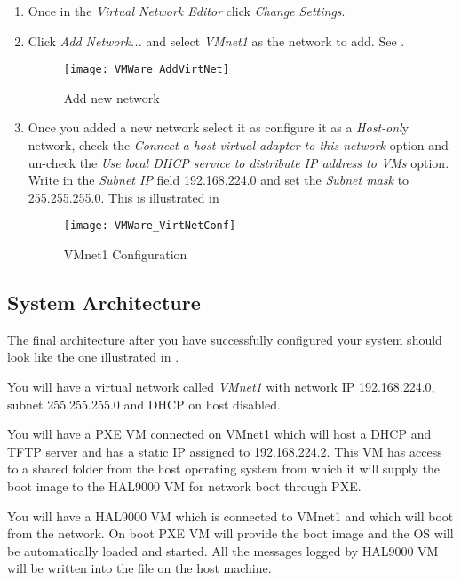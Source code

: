 \begin{appendices}
\begin{enumerate}
	\item Once in the \textit{Virtual Network Editor} click \textit{Change Settings}.

	\item Click \textit{Add Network...} and select \textit{VMnet1} as the network to add. See
.

\begin{figure}
	\centering
	\texttt{[image: VMWare\_AddVirtNet]}
		\caption{Add new network}
	\label{fig:VmWareAddNetwork}
\end{figure}

	\item Once you added a new network select it as configure it as a \textit{Host-onl}y network,
check the \textit{Connect a host virtual adapter to this network} option and un-check the
\textit{Use local DHCP service to distribute IP address to VMs} option. Write in the
\textit{Subnet IP} field 192.168.224.0 and set the \textit{Subnet mask} to 255.255.255.0. This is
illustrated in 

\begin{figure}
	\centering
	\texttt{[image: VMWare\_VirtNetConf]}
		\caption{VMnet1 Configuration}
	\label{fig:VmWareVirtNetConf}
\end{figure}

\end{enumerate}

\subsection{System Architecture}

The final architecture after you have successfully configured your system should look like the one
illustrated in .

You will have a virtual network called \textit{VMnet1} with network IP 192.168.224.0, subnet
255.255.255.0 and DHCP on host disabled.

You will have a PXE VM connected on VMnet1 which will host a DHCP and TFTP server and has a static
IP assigned to 192.168.224.2. This VM has access to a shared folder from the host operating system
from which it will supply the boot image to the HAL9000 VM for network boot through PXE.

You will have a HAL9000 VM which is connected to VMnet1 and which will boot from the network. On
boot PXE VM will provide the boot image and the OS will be automatically loaded and started. All
the messages logged by HAL9000 VM will be written into the  file on the host
machine.


\end{appendices}
